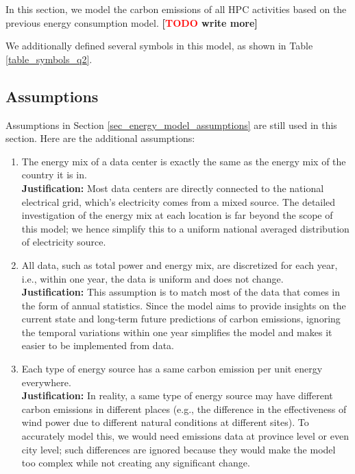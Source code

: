 \documentclass[12pt]{article}
\newcommand{\todo}[1]{\textbf{[\textcolor{red}{TODO} #1]}}
\begin{document}
In this section, we model the carbon emissions of all HPC activities based on the previous energy consumption model. \todo{write more}

We additionally defined several symbols in this model, as shown in Table \ref{table_symbols_q2}.

\subsection{Assumptions}

Assumptions in Section \ref{sec_energy_model_assumptions} are still used in this section. Here are the additional assumptions:

\begin{enumerate}
	\item The energy mix of a data center is exactly the same as the energy mix of the country it is in. \\
	\textbf{Justification:} Most data centers are directly connected to the national electrical grid, which's electricity comes from a mixed source. The detailed investigation of the energy mix at each location is far beyond the scope of this model; we hence simplify this to a uniform national averaged distribution of electricity source.

	\item All data, such as total power and energy mix, are discretized for each year, i.e., within one year, the data is uniform and does not change. \\
	\textbf{Justification:} This assumption is to match most of the data that comes in the form of annual statistics. Since the model aims to provide insights on the current state and long-term future predictions of carbon emissions, ignoring the temporal variations within one year simplifies the model and makes it easier to be implemented from data.

	\item Each type of energy source has a same carbon emission per unit energy everywhere. \\
	\textbf{Justification:} In reality, a same type of energy source may have different carbon emissions in different places (e.g., the difference in the effectiveness of wind power due to different natural conditions at different sites). To accurately model this, we would need emissions data at province level or even city level; such differences are ignored because they would make the model too complex while not creating any significant change.
\end{enumerate}
\end{document}
